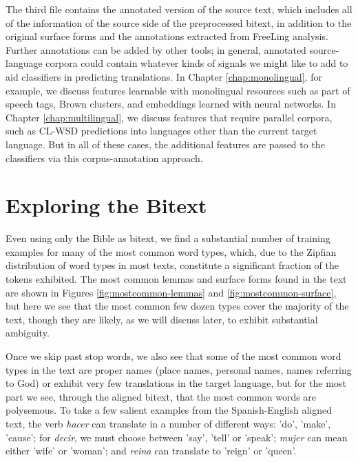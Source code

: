The third file contains the annotated version of the source text, which
includes all of the information of the source side of the preprocessed bitext,
in addition to the original surface forms and the annotations extracted from
FreeLing analysis. Further annotations can be added by other tools; in general,
annotated source-language corpora could contain whatever kinds of signals we
might like to add to aid classifiers in predicting translations. In Chapter
\ref{chap:monolingual}, for example, we discuss features learnable with
monolingual resources such as part of speech tags, Brown clusters, and
embeddings learned with neural networks. In Chapter \ref{chap:multilingual}, we
discuss features that require parallel corpora, such as CL-WSD predictions into
languages other than the current target language. But in all of these cases,
the additional features are passed to the classifiers via this
corpus-annotation approach.


\section{Exploring the Bitext}
\label{sec:exploring}
Even using only the Bible as bitext, we find a substantial number of
training examples for many of the most common word types, which, due to the
Zipfian distribution of word types in most texts, constitute a significant
fraction of the tokens exhibited.
The most common lemmas and surface forms found in the text are shown in Figures
\ref{fig:mostcommon-lemmas} and \ref{fig:mostcommon-surface}, but here we see
that the most common few dozen types cover the majority of the text, though
they are likely, as we will discuss later, to exhibit substantial ambiguity.

Once we skip past stop words, we also see that some of the most common word
types in the text are proper names (place names, personal names, names
referring to God) or exhibit very few translations in the target language, but
for the most part we see, through the aligned bitext, that the most common
words are polysemous.  To take a few salient examples from the Spanish-English
aligned text, the verb \emph{hacer} can translate in a number of different
ways: 'do', 'make', 'cause'; for \emph{decir}, we must choose between 'say',
'tell' or 'speak'; \emph{mujer} can mean either 'wife' or 'woman'; and
\emph{reina} can translate to 'reign' or 'queen'.

